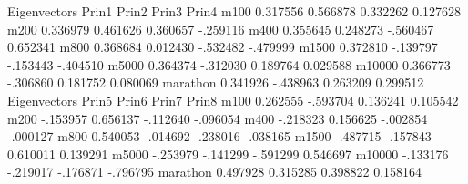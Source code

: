 \documentclass{article}
\begin{document}
\begin{Woutput}
                          Eigenvectors
                 Prin1         Prin2         Prin3         Prin4
m100          0.317556      0.566878      0.332262      0.127628
m200          0.336979      0.461626      0.360657      -.259116
m400          0.355645      0.248273      -.560467      0.652341
m800          0.368684      0.012430      -.532482      -.479999
m1500         0.372810      -.139797      -.153443      -.404510
m5000         0.364374      -.312030      0.189764      0.029588
m10000        0.366773      -.306860      0.181752      0.080069
marathon      0.341926      -.438963      0.263209      0.299512
                          Eigenvectors
                 Prin5         Prin6         Prin7         Prin8
m100          0.262555      -.593704      0.136241      0.105542
m200          -.153957      0.656137      -.112640      -.096054
m400          -.218323      0.156625      -.002854      -.000127
m800          0.540053      -.014692      -.238016      -.038165
m1500         -.487715      -.157843      0.610011      0.139291
m5000         -.253979      -.141299      -.591299      0.546697
m10000        -.133176      -.219017      -.176871      -.796795
marathon      0.497928      0.315285      0.398822      0.158164


\end{Woutput}
\end{document}
